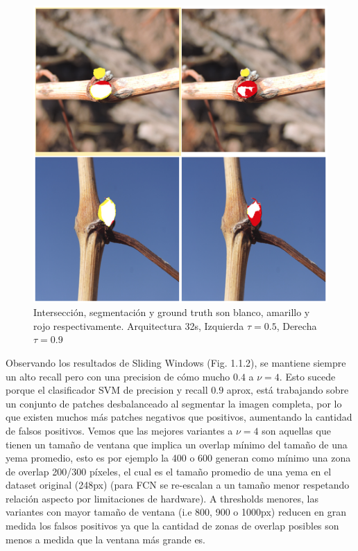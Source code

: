 \documentclass[a4paper,authoryear,review]{elsarticle}
\begin{document}
\begin{figure}
	\centering
	\includegraphics[width=12cm]{figures/buds.png}
	\caption{Intersección, segmentación y ground truth son blanco, amarillo y rojo respectivamente. Arquitectura 32s, Izquierda $\tau=0.5$, Derecha $\tau=0.9$}
	\label{fig:Fig1.3.1}
\end{figure}

Observando los resultados de Sliding Windows (Fig. 1.1.2), se mantiene siempre un alto recall pero con una precision de cómo mucho $0.4$ a $\nu=4$. Esto sucede porque el clasificador SVM de precision y recall $0.9$ aprox, está trabajando sobre un conjunto de patches desbalanceado al segmentar la imagen completa, por lo que existen muchos más patches negativos que positivos, aumentando la cantidad de falsos positivos. 
Vemos que las mejores variantes a $\nu=4$ son aquellas que tienen un tamaño de ventana que implica un overlap mínimo del tamaño de una yema promedio, esto es por ejemplo la 400 o 600 generan como mínimo una zona de overlap 200/300 píxeles, el cual es el tamaño promedio de una yema en el dataset original (248px) (para FCN se re-escalan a un tamaño menor respetando relación aspecto por limitaciones de hardware). A thresholds menores, las variantes con mayor tamaño de ventana (i.e 800, 900 o 1000px) reducen en gran medida los falsos positivos ya que la cantidad de zonas de overlap posibles son menos a medida que la ventana más grande es.
\end{document}
